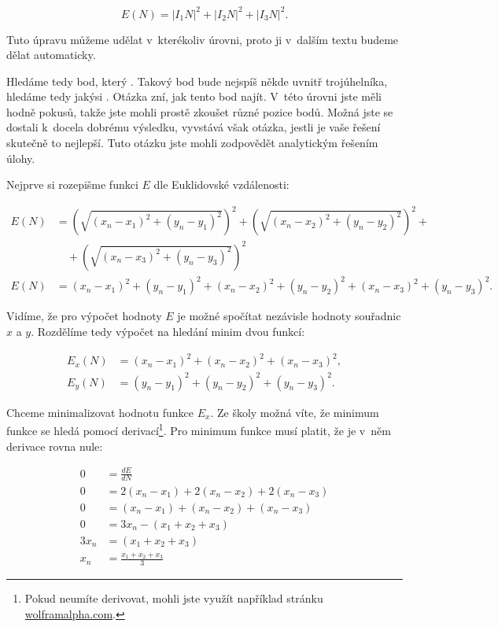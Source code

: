 \documentclass[12pt,a4paper]{article}
\begin{document}
$$E(N) = |I_1N|^2 + |I_2N|^2 + |I_3N|^2.$$

Tuto úpravu můžeme udělat v~kterékoliv úrovni, proto ji v~dalším textu budeme
dělat automaticky.

Hledáme tedy bod, který . Takový bod bude
nejspíš někde uvnitř trojúhelníka, hledáme tedy jakýsi . Otázka zní,
jak tento bod najít. V~této úrovni jste měli hodně pokusů, takže jste mohli
prostě zkoušet různé pozice bodů. Možná jste se dostali k~docela dobrému
výsledku, vyvstává však otázka, jestli je vaše řešení skutečně to nejlepší.
Tuto otázku jste mohli zodpovědět analytickým řešením úlohy.

Nejprve si rozepišme funkci $E$ dle Euklidovské vzdálenosti:

\begin{align}
E(N) &= \left(\sqrt{(x_n-x_1)^2 + (y_n - y_1)^2}\right)^2 +
	\left(\sqrt{(x_n-x_2)^2 + (y_n - y_2)^2}\right)^2 + \nonumber \\
	&\hspace{1em} + \left(\sqrt{(x_n-x_3)^2 + (y_n - y_3)^2}\right)^2 \nonumber \\
E(N) &= (x_n-x_1)^2 + (y_n - y_1)^2 +
	(x_n-x_2)^2 + (y_n - y_2)^2 +
	(x_n-x_3)^2 + (y_n - y_3)^2 \nonumber.
\end{align}

Vidíme, že pro výpočet hodnoty $E$ je možné spočítat nezávisle hodnoty souřadnic
$x$ a $y$. Rozdělíme tedy výpočet na hledání minim dvou funkcí:

\begin{align}
E_x(N) &= (x_n-x_1)^2 + (x_n-x_2)^2 + (x_n-x_3)^2 \nonumber, \\
E_y(N) &= (y_n-y_1)^2 + (y_n-y_2)^2 + (y_n-y_3)^2 \nonumber.
\end{align}

Chceme minimalizovat hodnotu funkce $E_x$. Ze školy možná víte, že minimum
funkce se hledá pomocí derivací\footnote{Pokud neumíte derivovat, mohli jste
využít například stránku \url{wolframalpha.com}.}. Pro minimum funkce musí
platit, že je v~něm derivace rovna nule:

\begin{align}
0 &= \frac{dE}{dN} \nonumber \\
0 &= 2(x_n-x_1) + 2(x_n-x_2) + 2(x_n-x_3) \nonumber \\
0 &= (x_n-x_1) + (x_n-x_2) + (x_n-x_3) \nonumber \\
0 &= 3x_n - (x_1 + x_2 + x_3) \nonumber \\
3x_n &= (x_1 + x_2 + x_3) \nonumber \\
x_n &= \frac{x_1 + x_2 + x_3}{3} \nonumber
\end{align}
\end{document}
